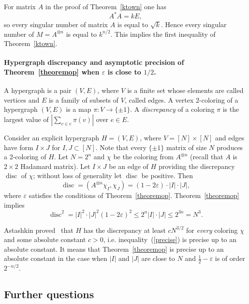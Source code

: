 \documentclass[8pt]{article}
\DeclareMathOperator{\disc}{\operatorname{disc}}
\begin{document}
For matrix $A$ in the proof of Theorem~\ref{ktown} one has
\[
A^*A = kE,
\]
so every singular number of matrix $A$ is equal to $\sqrt{k}$.
Hence every singular number of $M = A^{\otimes n}$ is equal to $k^{n/2}$.
This implies the first inequality of Theorem~\ref{ktown}.

\paragraph{Hypergraph discrepancy and asymptotic precision of Theorem~\ref{theoremop} when $\varepsilon$ is close to $1/2$.}
A hypergraph is a pair $(V, E)$, where $V$ is a finite set whose elements are called vertices and $E$ is a family of subsets of $V$, called edges. 
A vertex $2$-coloring of a hypergraph $(V, E)$ is a map $\pi : V \rightarrow \{\pm 1\}$. 
A \textit{discrepancy} of a coloring $\pi$ is the largest value of $|\sum_{v\in e} \pi (v) |$ over $e \in E$.


Consider an explicit hypergraph $H = (V,E)$, where $V = [N] \times [N]$ and edges have form $I \times J$ for $I,J \subset [N]$. 
Note that every $\{\pm 1\}$ matrix of size $N$ produces a 2-coloring of $H$.
Let $N = 2^n$ and $\chi$ be the coloring from $A^{\otimes n}$ (recall that $A$ is $2\times2$ Hadamard matrix).
Let $I \times J$ be an edge of $H$ providing the discrepancy $\disc$ of $\chi$; without loss of generality let $\disc$ be positive. Then
\[
\disc = (A^{\otimes n} \chi_I, \chi_J) =  (1-2\varepsilon) \cdot |I| \cdot |J|,
\]
where $\varepsilon$ satisfies the conditions of Theorem~\ref{theoremop}. Theorem~\ref{theoremop} implies 
\begin{equation}
    \disc^2 = |I|^2 \cdot |J|^2 (1-2\varepsilon)^2  \leq 2^n |I|\cdot |J| \leq 2^{3n} = N^3.
\label{precise}
\end{equation}

Astashkin proved~\cite{astashkin2010rademacher} that $H$ has the discrepancy at least $cN^{3/2}$ for \textit{every} coloring $\chi$ and some absolute constant $c > 0$, i.e. inequality~(\ref{precise}) is precise up to an absolute constant. It means that Theorem~\ref{theoremop} is precise up to an absolute constant in the case when $|I|$ and $|J|$ are close to $N$ and $\frac{1}{2} - \varepsilon$ is of order $2^{-n/2}$.  




\subsection{Further questions}
\end{document}
